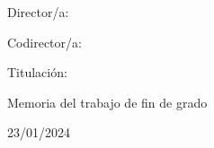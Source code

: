 \begin{titlepage}
  \centering


  {\vspace*{3cm}}

  {\huge {\bfseries {\getTitulo}} \par \vspace*{2cm}}

  {\huge \par \vspace*{5cm}}

  {{\Large \getAutor} \par}

  \vspace{2cm}
  {\small Director/a: {\getDirector} \par }
    {\small Codirector/a: {\getCodirector} \par }
    {\small Titulación: {\getTitulacion} \par \vspace*{2.5mm}}
    {\small Memoria del trabajo de fin de grado \par}
    {\small {\getFacultad} \par}
    {\small {\getUniversidad} \par}
    {\small 23/01/2024 \par}
\end{titlepage}
